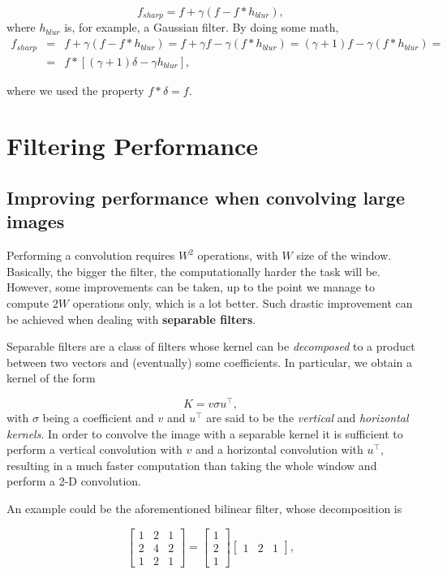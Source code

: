 \documentclass[10pt]{report}
\begin{document}
\[f_{sharp} = f + \gamma(f - f * h_{blur}),\] where \(h_{blur}\) is, for
example, a Gaussian filter. By doing some math,
\[\begin{array}{lll}f_{sharp} & = & f + \gamma(f - f * h_{blur}) = f + \gamma f - \gamma (f * h_{blur}) = (\gamma + 1) f - \gamma (f * h_{blur}) = \\ & = & f * [(\gamma + 1) \delta - \gamma h_{blur}],\end{array}\]

where we used the property \(f * \delta = f\).

\section{Filtering Performance}
\label{filtering-performance}
\subsection{Improving performance when convolving large images}
\label{improving-performance-when-convolving-large-images}
Performing a convolution requires \(W^2\) operations, with \(W\) size of
the window. Basically, the bigger the filter, the computationally harder
the task will be. However, some improvements can be taken, up to the
point we manage to compute \(2W\) operations only, which is a lot
better. Such drastic improvement can be achieved when dealing with
\textbf{separable filters}.

Separable filters are a class of filters whose kernel can be
\emph{decomposed} to a product between two vectors and (eventually) some
coefficients. In particular, we obtain a kernel of the form

\[K = v\sigma u^\top,\] with \(\sigma\) being a coefficient and \(v\)
and \(u^\top\) are said to be the \emph{vertical} and \emph{horizontal kernels}.
In order to convolve the image with a separable kernel it is sufficient
to perform a vertical convolution with \(v\) and a horizontal
convolution with \(u^\top\), resulting in a much faster computation than
taking the whole window and perform a 2-D convolution.

An example could be the aforementioned bilinear filter, whose
decomposition is

\[ \begin{bmatrix} 1 & 2 & 1\\ 2 & 4 & 2\\ 1 & 2 & 1 \end{bmatrix} = \begin{bmatrix} 1 \\ 2 \\ 1 \end{bmatrix} \begin{bmatrix} 1 & 2 & 1 \end{bmatrix}, \]
\end{document}
